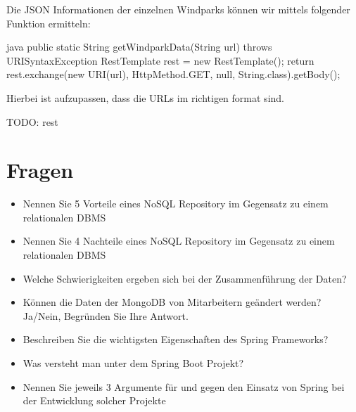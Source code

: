 Die JSON Informationen der einzelnen Windparks können wir mittels folgender Funktion ermitteln:

\begin{code}{java}
    public static String getWindparkData(String url) throws URISyntaxException {
        RestTemplate rest = new RestTemplate();
        return rest.exchange(new URI(url), HttpMethod.GET, null, String.class).getBody();
    }
\end{code}

Hierbei ist aufzupassen, dass die URLs im richtigen format sind.



TODO: rest





\clearpage
\section{Fragen}

\begin{itemize}
    \item Nennen Sie 5 Vorteile eines NoSQL Repository im Gegensatz zu einem relationalen DBMS
    \item Nennen Sie 4 Nachteile eines NoSQL Repository im Gegensatz zu einem relationalen DBMS
    \item Welche Schwierigkeiten ergeben sich bei der Zusammenführung der Daten?
    \item Können die Daten der MongoDB von Mitarbeitern geändert werden?
        Ja/Nein, Begründen Sie Ihre Antwort.
    \item Beschreiben Sie die wichtigsten Eigenschaften des Spring Frameworks?
    \item Was versteht man unter dem Spring Boot Projekt?
    \item Nennen Sie jeweils 3 Argumente für und gegen den Einsatz von Spring bei der Entwicklung solcher Projekte
\end{itemize}
